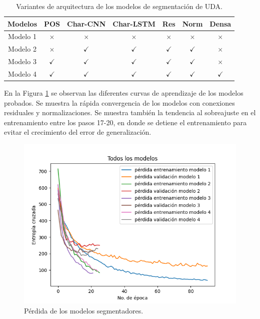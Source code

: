 \begin{table}[h!]
	\begin{center}
		\begin{tabular}{|c|c|c|c|c|c|c|} \hline
		Modelos 		& POS       & Char-CNN  & Char-LSTM & Res       & Norm      & Densa  \\ \hline
		Modelo 1		& $\times$	& $\times$    & $\times$    & $\times$	& $\times$    & $\times$ \\ \hline
		Modelo 2		& $\times$	& $\checkmark$    & $\checkmark$    & $\checkmark$	& $\checkmark$    & $\times$ \\ \hline
		Modelo 3		& $\checkmark$	& $\checkmark$    & $\checkmark$    & $\checkmark$	& $\checkmark$    & $\times$ \\ \hline
		Modelo 4		& $\checkmark$	& $\checkmark$    & $\checkmark$    & $\checkmark$	& $\checkmark$    & $\checkmark$ \\ \hline
		\end{tabular}
	\caption{Variantes de arquitectura de los modelos de segmentación de UDA.}\label{table:segmenter_architecture_table}
	\end{center}
\end{table}

En la Figura \ref{fig:segmenter_model_loss} se observan las diferentes curvas de aprendizaje de los modelos 
probados. Se muestra la rápida convergencia de los modelos con conexiones residuales y normalizaciones.
Se muestra también la tendencia al sobreajuste en el entrenamiento entre los pasos 17-20, en donde se detiene el 
entrenamiento para evitar el crecimiento del error de generalización.

\begin{figure}[h!]
	\begin{center}
		\begin{center}
			\includegraphics[scale=.7]{Graphics/persuasive_essays_all_linked_crf_loss.png}
        \end{center}
	    \caption{Pérdida de los modelos segmentadores.}\label{fig:segmenter_model_loss}
	\end{center}
\end{figure}

